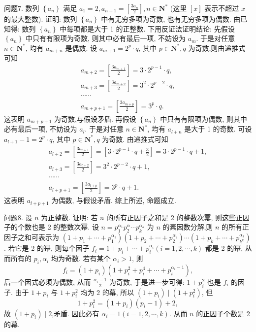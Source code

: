 问题7. 数列 $\left\{a_n\right\}$ 满足 $a_1=2, a_{n+1}=\left[\frac{3 a_n}{2}\right], n \in \mathbf{N}^*$ (这里 $[x]$ 表示不超过 $x$ 的最大整数). 证明: 数列 $\left\{a_n\right\}$ 中有无穷多项为奇数, 也有无穷多项为偶数.
由已知得: 数列 $\left\{a_n\right\}$ 中每项都是大于 1 的正整数.
下用反证法证明结论:
先假设 $\left\{a_n\right\}$ 中只有有限项为奇数, 则其中必有最后一项, 不妨设为 $a_m$. 于是对任意 $n \in \mathbf{N}^*$, 均有 $a_{m+n}$ 是偶数.
设 $a_{m+1}=2^p \cdot q$, 其中 $p \in \mathbf{N}^*, q$ 为奇数,则由递推式可知
$$
\begin{gathered}
a_{m+2}=\left[\frac{3 a_{m+1}}{2}\right]=3 \cdot 2^{p-1} \cdot q, \\
a_{m+3}=\left[\frac{3 a_{m+2}}{2}\right]=3^2 \cdot 2^{p-2} \cdot q, \\
\cdots \cdots \\
a_{m+p+1}=\left[\frac{3 a_{m+p}}{2}\right]=3^p \cdot q .
\end{gathered}
$$
这表明 $a_{m+p+1}$ 为奇数,与假设矛盾.
再假设 $\left\{a_n\right\}$ 中只有有限项为偶数, 则其中必有最后一项, 不妨设为 $a_l$. 于是对任意 $n \in \mathbf{N}^*$, 均有 $a_{l+n}$ 是大于 1 的奇数.
可设 $a_{l+1}-1=2^p \cdot q$, 其中 $p \in \mathbf{N}^*, q$ 为奇数.
由递推式可知
$$
\begin{gathered}
a_{l+2}=\left[\frac{3 a_{l+1}}{2}\right]=\left[3 \cdot 2^{p-1} \cdot q+\frac{3}{2}\right]=3 \cdot 2^{p-1} \cdot q+1, \\
a_{l+3}=\left[\frac{3 a_{l+2}}{2}\right]=3^2 \cdot 2^{p-2} \cdot q+1, \\
\cdots \cdots \\
a_{l+p+1}=\left[\frac{3 a_{l+p}}{2}\right]=3^p \cdot q+1 .
\end{gathered}
$$
这表明 $a_{l+p+1}$ 为偶数, 与假设矛盾.
综上所述, 命题成立.



问题8. 设 $n$ 为正整数.
证明: 若 $n$ 的所有正因子之和是 2 的整数次幂, 则这些正因子的个数也是 2 的整数次幂.
设 $n=p_1^{\alpha_1} p_2^\alpha \cdots p_k^{\alpha_k}$ 为 $n$ 的素因数分解,则 $n$ 的所有正因子之和可表示为 $\left(1+p_1+\cdots+p_1^{\alpha_1}\right)\left(1+p_2+\cdots+p_2^{\alpha_2}\right) \cdots\left(1+p_k+\cdots+p_{k^k}^{\alpha_k}\right)$.
若它是 2 的幂, 则每个因子 $f_i=1+p_i+\cdots+p_i^{\alpha_i}(i=1,2, \cdots, k)$ 都是 2 的幂, 从而所有的 $p_i, \alpha_i$ 均为奇数.
若有某个 $\alpha_i>1$, 则
$$
f_i=\left(1+p_i\right)\left(1+p_i^2+p_i^4+\cdots+p_i^{\alpha_i-1}\right),
$$
后一个因式必须为偶数, 从而 $\frac{\alpha_i-1}{2}$ 为奇数, 于是进一步可得: $1+p_i^2$ 也是 $f_i$ 的因子.
由于 $1+p_i$ 与 $1+p_i^2$ 均为 2 的幕, 所以 $\left(1+p_i\right) \mid\left(1+p_i^2\right)$, 但
$$
1+p_i^2=\left(1+p_i\right)\left(p_i-1\right)+2,
$$
故 $\left(1+p_i\right) \mid 2$,矛盾.
因此必有 $\alpha_i=1(i=1,2, \cdots, k)$.
从而 $n$ 的正因子个数是 2 的幕.



